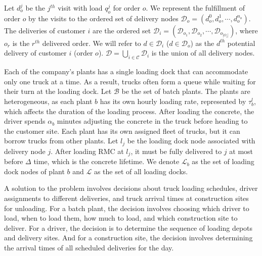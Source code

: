 \documentclass{article}
\begin{document}
Let $d^j_{o}$ be the $j^{th}$ visit with load $q^j_{o}$ for order $o$. We represent the fulfillment of order $o$ by the visits to the ordered set of delivery nodes $\mathcal{D}_o= \left(d^0_{o},d^1_{o},\cdots, d^{n_o}_{o}\right)$. The deliveries of customer $i$ are the ordered set $\mathcal{D}_i= (\mathcal{D}_{o_1}, \mathcal{D}_{o_2},\cdots,\mathcal{D}_{o_{|O_i|}})$, where $o_r$ is the $r^{th}$ delivered order. We will refer to $d \in \mathcal{D}_i$ ($d \in \mathcal{D}_o$) as the $d^{th}$ potential delivery of customer $i$ (order $o$). $\mathcal{D}=\bigcup_{i\in \mathcal{C}} \mathcal{D}_i$ is the union of all delivery nodes.


Each of the company's plants has a single loading dock that can accommodate only one truck at a time. As a result, trucks often form a queue while waiting for their turn at the loading dock. Let $\mathcal{B}$ be the set of batch plants. The plants are heterogeneous, as each plant $b$ has its own hourly loading rate, represented by $\tau^l_b$, which affects the duration of the loading process. After loading the concrete, the driver spends $\alpha_b$ minutes adjusting the concrete in the truck before heading to the customer site. Each plant has its own assigned fleet of trucks, but it can borrow trucks from other plants. Let $l_{j}$ be the loading dock node associated with delivery node $j$. After loading RMC at $l_j$, it must be fully delivered to $j$ at most before $\Delta$ time, which is the concrete lifetime. We denote $\mathcal{L}_b$ as the set of loading dock nodes of plant $b$ and $\mathcal{L}$ as the set of all loading docks.

A solution to the problem involves decisions about truck loading schedules, driver assignments to different deliveries, and truck arrival times at construction sites for unloading. For a batch plant, the decision involves choosing which driver to load, when to load them, how much to load, and which construction site to deliver. For a driver, the decision is to determine the sequence of loading depots and delivery sites. And for a construction site, the decision involves determining the arrival times of all scheduled deliveries for the day.
\end{document}
